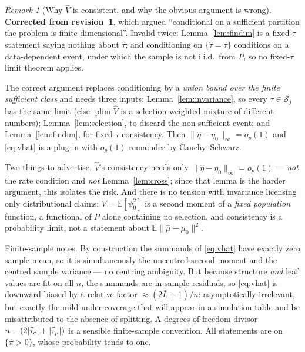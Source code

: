 \documentclass[11pt]{article}
\theoremstyle{plain}
\theoremstyle{definition}
\theoremstyle{remark}
\newtheorem{remark}{Remark}
\newcommand{\E}{\mathbb{E}}
\newcommand{\cS}{\mathcal{S}}
\newcommand{\mz}{\mu_0}
\newcommand{\mhat}{\widehat{\mu}}
\newcommand{\that}{\widehat{\tau}}
\newcommand{\pihat}{\widehat{\pi}}
\newcommand{\Vhat}{\widehat{V}}
\DeclarePairedDelimiter{\card}{\lvert}{\rvert}
\begin{document}
\begin{remark}[Why $\Vhat$ is consistent, and why the obvious argument is wrong]
\label{rem:vhat}
\textbf{Corrected from revision~1}, which argued ``conditional on a sufficient
partition the problem is finite-dimensional''. Invalid twice: Lemma~\ref{lem:findim}
is a fixed-$\tau$ statement saying nothing about $\that$; and conditioning on
$\{\that=\tau\}$ conditions on a data-dependent event, under which the sample is
not i.i.d.\ from $P$, so no fixed-$\tau$ limit theorem applies.

The correct argument replaces conditioning by a \emph{union bound over the finite
sufficient class} and needs three inputs: Lemma~\ref{lem:invariance}, so every
$\tau\in\cS_j$ has the same limit (else $\operatorname{plim}\Vhat$ is a
selection-weighted mixture of different numbers); Lemma~\ref{lem:selection}, to
discard the non-sufficient event; and Lemma~\ref{lem:findim}, for fixed-$\tau$
consistency. Then $\lVert\widehat\eta-\eta_0\rVert_\infty=o_p(1)$ and
\eqref{eq:vhat} is a plug-in with $o_p(1)$ remainder by Cauchy--Schwarz.

Two things to advertise. $\Vhat$'s consistency needs only
$\lVert\widehat\eta-\eta_0\rVert_\infty=o_p(1)$ --- \emph{not} the rate condition
and \emph{not} Lemma~\ref{lem:cross}; since that lemma is the harder argument,
this isolates the risk. And there is no tension with invariance licensing only
distributional claims: $V=\E[\psi_0^2]$ is a second moment of a \emph{fixed
population} function, a functional of $P$ alone containing no selection, and
consistency is a probability limit, not a statement about
$\E\lVert\mhat-\mz\rVert^2$.

Finite-sample notes. By construction the summands of \eqref{eq:vhat} have exactly
zero sample mean, so it is simultaneously the uncentred second moment and the
centred sample variance --- no centring ambiguity. But because structure
\emph{and} leaf values are fit on all $n$, the summands are in-sample residuals,
so \eqref{eq:vhat} is downward biased by a relative factor
$\approx(2\bar L+1)/n$: asymptotically irrelevant, but exactly the mild
under-coverage that will appear in a simulation table and be misattributed to the
absence of splitting. A degrees-of-freedom divisor
$n-(2\card{\that_e}+\card{\that_\mu})$ is a sensible finite-sample convention. All
statements are on $\{\pihat>0\}$, whose probability tends to one.
\end{remark}
\end{document}
